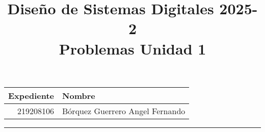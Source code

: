 \documentclass[a4paper, 12pt]{article}
\title
{
    Diseño de Sistemas Digitales 2025-2 \\
    Problemas Unidad 1
}
\begin{document}
    \maketitle

    \begin{center}
        \begin{tabular}{r|l}
            \textbf{Expediente} & \textbf{Nombre} \\ \hline
            219208106 & Bórquez Guerrero Angel Fernando \\
        \end{tabular}
    \end{center}

    \rule{\linewidth}{0.3mm}



    \vspace{0.3cm}
\end{document}
